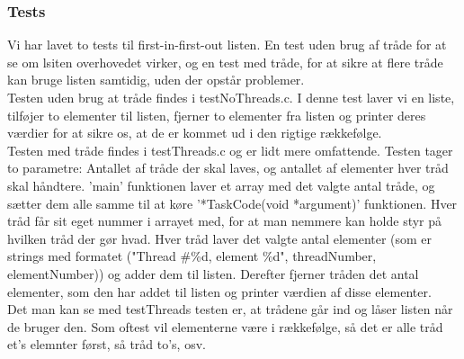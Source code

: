 \subsubsection{Tests}
\label{O2_Tests}
Vi har lavet to tests til first-in-first-out listen. En test uden brug af tråde for at se om lsiten overhovedet virker, og en test med tråde, for at sikre at flere tråde kan bruge listen samtidig, uden der opstår problemer.
\\Testen uden brug at tråde findes i testNoThreads.c. I denne test laver vi en liste, tilføjer to elementer til listen, fjerner to elementer fra listen og printer deres værdier for at sikre os, at de er kommet ud i den rigtige rækkefølge. 
\\Testen med tråde findes i testThreads.c og er lidt mere omfattende. Testen tager to parametre: Antallet af tråde der skal laves, og antallet af elementer hver tråd skal håndtere. 'main' funktionen laver et array med det valgte antal tråde, og sætter dem alle samme til at køre '*TaskCode(void *argument)' funktionen. Hver tråd får sit eget nummer i arrayet med, for at man nemmere kan holde styr på hvilken tråd der gør hvad. Hver tråd laver det valgte antal elementer (som er strings med formatet ("Thread \#\%d, element \%d", threadNumber, elementNumber)) og adder dem til listen. Derefter fjerner tråden det antal elementer, som den har addet til listen og printer værdien af disse elementer. 
\\Det man kan se med testThreads testen er, at trådene går ind og låser listen når de bruger den. Som oftest vil elementerne være i rækkefølge, så det er alle tråd et's elemnter først, så tråd to's, osv.

